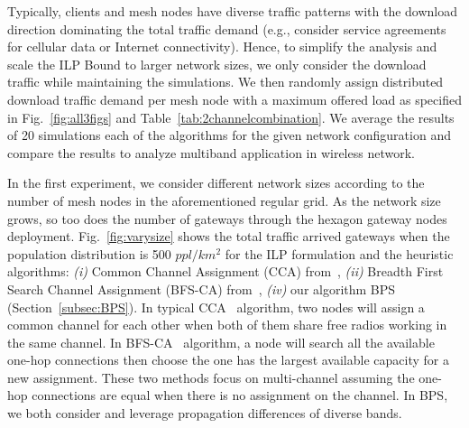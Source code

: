 
Typically, clients and mesh nodes have diverse traffic patterns with
the download direction dominating the total traffic demand (e.g., consider
service agreements for cellular data or Internet connectivity). Hence, to
simplify the analysis and scale the ILP Bound to larger network sizes, we 
only consider the download traffic while maintaining the simulations.
We then randomly assign distributed download traffic demand per 
mesh node with a maximum offered load as specified in Fig.~\ref{fig:all3figs} 
and Table~\ref{tab:2channelcombination}. We average the results of 20 simulations 
each of the algorithms for the given network configuration and compare 
the results to analyze multiband application in wireless network.

In the first experiment, we consider different network sizes according to
the number of mesh nodes in the aforementioned regular grid. 
As the network size grows, so too does the number of gateways through the 
hexagon gateway nodes deployment. 
Fig.~\ref{fig:varysize} shows the total traffic arrived gateways when the 
population distribution is 500 $ppl/km^2$ for the ILP formulation and 
the heuristic algorithms: 
{\it (i)} Common Channel Assignment (CCA) from~\cite{draves2004routing},
{\it (ii)} Breadth First Search Channel Assignment (BFS-CA) from~\cite{ramachandran2006interference},
{\it (iv)} our algorithm BPS (Section~\ref{subsec:BPS}).
In typical CCA~\cite{draves2004routing} algorithm, two nodes will assign a common channel 
for each other when both of them share free radios working in the same channel. 
In BFS-CA~\cite{tang2005interference} algorithm, a node will search all the 
available one-hop connections then choose the one has the largest available capacity for a new assignment. 
These two methods focus on multi-channel assuming the one-hop connections are equal 
when there is no assignment on the channel. 
In BPS, we both consider and leverage propagation differences of diverse bands.



